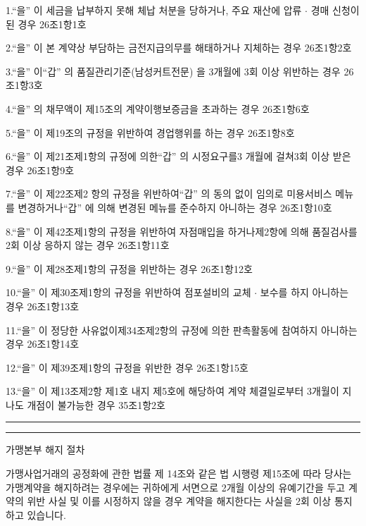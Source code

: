 \documentclass[a5paper,10pt]{oblivoir}
\newcommand\crule[3][black]{\textcolor{#1}{\rule{#2}{#3}}}
\begin{document}
\begin{enumerate}
\begin{tiny}
\begin{Form}
1.``을'' 이 세금을 납부하지 못해 체납 처분을 당하거나, 주요 재산에 압류 $\cdot$ 경매 신청이 된 경우
\noindent\dotfill 
26조1항1호

2.``을'' 이 본 계약상 부담하는 금전지급의무를 해태하거나 지체하는 경우
\noindent\dotfill 
26조1항2호

3.``을'' 이``갑'' 의 품질관리기준(남성커트전문) 을 3개월에 3회 이상 위반하는 경우
\noindent\dotfill 
26조1항3호

4.``을'' 의 채무액이 제15조의  계약이행보증금을 초과하는 경우
\noindent\dotfill 
26조1항6호

5.``을'' 이 제19조의 규정을 위반하여 경업행위를 하는 경우
\noindent\dotfill 
26조1항8호

6.``을''  이 제21조제1항의  규정에 의한``갑'' 의 시정요구를3 개월에 걸쳐3회  이상 받은 경우
\noindent\dotfill 
26조1항9호

7.``을''  이 제22조제2 항의 규정을 위반하여``갑'' 의 동의 없이 임의로 미용서비스 메뉴를 변경하거나``갑'' 에 의해 변경된 메뉴를 준수하지 아니하는 경우
\noindent\dotfill 
26조1항10호

8.``을''  이 제42조제1항의 규정을 위반하여 자점매입을 하거나제2항에 의해 품질검사를2회 이상 응하지 않는 경우
\noindent\dotfill 
26조1항11호

9.``을''  이 제28조제1항의 규정을 위반하는 경우
\noindent\dotfill 
26조1항12호

10.``을''  이 제30조제1항의 규정을 위반하여 점포설비의 교체 $\cdot$ 보수를 하지 아니하는 경우
\noindent\dotfill 
26조1항13호

11.``을''  이  정당한 사유없이제34조제2항의  규정에 의한 판촉활동에 참여하지 아니하는 경우
\noindent\dotfill 
26조1항14호

12.``을''  이 제39조제1항의 규정을 위반한 경우
\noindent\dotfill 
26조1항15호

13.``을''  이 제13조제2항 제1호 내지 제5호에 해당하여 계약 체결일로부터 3개월이 지나도 개점이 불가능한 경우
\noindent\dotfill 
35조1항2호
 \end{Form}
\end{tiny}


\newpage
\begin{center}
\crule[red]{4cm}{0.1cm} \crule[blue]{4cm}{0.1cm}
\end{center}

 가맹본부 해지 절차

가맹사업거래의 공정화에 관한 법률 제 14조와 같은 법 시행령 제15조에 따라 당사는 가맹계약을 해지하려는 경우에는 귀하에게 서면으로 2개월 이상의 유예기간을 두고 계약의 위반 사실 및 이를 시정하지 않을 경우 계약을 해지한다는 사실을 2회 이상 통지하고 있습니다.



\end{enumerate}
\end{document}

